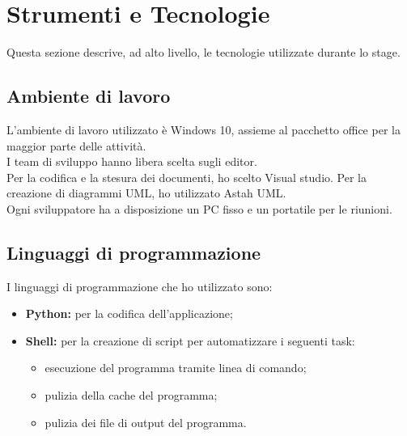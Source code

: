 \section{Strumenti e Tecnologie}
Questa sezione descrive, ad alto livello, le tecnologie utilizzate durante lo stage.
\subsection{Ambiente di lavoro}
L'ambiente di lavoro utilizzato è Windows 10, assieme al pacchetto office per la maggior parte delle attività.\\
I team di sviluppo hanno libera scelta sugli editor.\\Per la codifica e la stesura dei documenti, ho scelto Visual studio. Per la creazione di diagrammi UML, ho utilizzato Astah UML.\\
Ogni sviluppatore ha a disposizione un PC fisso e un portatile per le riunioni.

\subsection{Linguaggi di programmazione}
I linguaggi di programmazione che ho utilizzato sono:
\begin{itemize}
    \item \textbf{Python:} per la codifica dell'applicazione;
    \item \textbf{Shell:} per la creazione di script per automatizzare i seguenti task:
    \begin{itemize}
        \item esecuzione del programma tramite linea di comando;
        \item pulizia della cache del programma;
        \item pulizia dei file di output del programma.
    \end{itemize}
\end{itemize}

